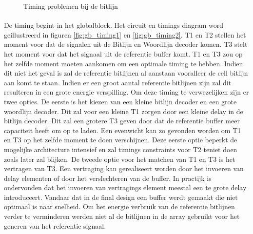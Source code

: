 \begin{figure}[h!]
\centering
{}
\caption{Timing problemen bij de bitlijn}
\end{figure}

\paragraph{}
De timing begint in het globalblock. Het circuit en timings diagram word geillustreerd in figuren \ref{fig:gb_timing1} en \ref{fig:gb_timing2}. T1 en T2 stellen het moment voor dat de signalen uit de Bitlijn en Woordlijn decoder komen. T3 stelt het moment voor dat het signaal uit de referentie buffer komt. T1 en T3 zou op het zelfde moment moeten aankomen om een optimale timing te hebben. Indien dit niet het geval is zal de referentie bitlijnen al aanstaan vooralleer de cell bitlijn aan komt te staan. Indien er een groot aantal referentie bitlijnen zijn zal dit resulteren in een grote energie verspilling. Om deze timing te verwezelijken zijn er twee opties. De eerste is het kiezen van een kleine bitlijn decoder en een grote woordlijn decoder. Dit zal voor een kleine T1 zorgen door een kleine delay in de bitlijn decoder. Dit zal een grotere T3 geven door dat de referentie buffer meer capaciteit heeft om op te laden. Een evenwicht kan zo gevonden worden om T1 en T3 op het zelfde moment te doen verschijnen. Deze eerste optie beperkt de mogelijke architecture intensief en zal timings constraints voor T2 teniet doen zoals later zal blijken. De tweede optie voor het matchen van T1 en T3 is het vertragen van T3. Een vertraging kan gerealiseert worden door het invoeren van delay elementen of door het verslechteren van de buffer. In practijk is ondervonden dat het invoeren van vertragings element meestal een te grote delay introduceert. Vandaar dat in de final design een buffer werdt gemaakt die niet optimaal is naar snelheid. Om het energie verbruik van de referentie bitlijnen verder te verminderen werden niet al de bitlijnen in de array gebruikt voor het generen van het referentie signaal.

